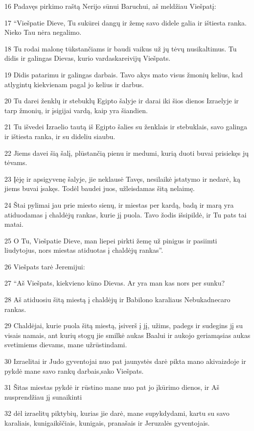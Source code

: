 \par 16 Padavęs pirkimo raštą Nerijo sūnui Baruchui, aš meldžiau Viešpatį: 
\par 17 “Viešpatie Dieve, Tu sukūrei dangų ir žemę savo didele galia ir ištiesta ranka. Nieko Tau nėra negalimo. 
\par 18 Tu rodai malonę tūkstančiams ir baudi vaikus už jų tėvų nusikaltimus. Tu didis ir galingas Dievas, kurio vardas­kareivijų Viešpats. 
\par 19 Didis patarimu ir galingas darbais. Tavo akys mato visus žmonių kelius, kad atlygintų kiekvienam pagal jo kelius ir darbus. 
\par 20 Tu darei ženklų ir stebuklų Egipto šalyje ir darai iki šios dienos Izraelyje ir tarp žmonių, ir įsigijai vardą, kaip yra šiandien. 
\par 21 Tu išvedei Izraelio tautą iš Egipto šalies su ženklais ir stebuklais, savo galinga ir ištiesta ranka, ir su dideliu siaubu. 
\par 22 Jiems davei šią šalį, plūstančią pienu ir medumi, kurią duoti buvai prisiekęs jų tėvams. 
\par 23 Įėję ir apsigyvenę šalyje, jie neklausė Tavęs, nesilaikė įstatymo ir nedarė, ką jiems buvai įsakęs. Todėl baudei juos, užleisdamas šitą nelaimę. 
\par 24 Štai pylimai jau prie miesto sienų, ir miestas per kardą, badą ir marą yra atiduodamas į chaldėjų rankas, kurie jį puola. Tavo žodis išsipildė, ir Tu pats tai matai. 
\par 25 O Tu, Viešpatie Dieve, man liepei pirkti žemę už pinigus ir pasiimti liudytojus, nors miestas atiduotas į chaldėjų rankas”. 
\par 26 Viešpats tarė Jeremijui: 
\par 27 “Aš Viešpats, kiekvieno kūno Dievas. Ar yra man kas nors per sunku? 
\par 28 Aš atiduosiu šitą miestą į chaldėjų ir Babilono karaliaus Nebukadnecaro rankas. 
\par 29 Chaldėjai, kurie puola šitą miestą, įsiverš į jį, užims, padegs ir sudegins jį su visais namais, ant kurių stogų jie smilkė aukas Baalui ir aukojo geriamąsias aukas svetimiems dievams, mane užrūstindami. 
\par 30 Izraelitai ir Judo gyventojai nuo pat jaunystės darė pikta mano akivaizdoje ir pykdė mane savo rankų darbais,­sako Viešpats.­ 
\par 31 Šitas miestas pykdė ir rūstino mane nuo pat jo įkūrimo dienos, ir Aš nusprendžiau jį sunaikinti 
\par 32 dėl izraelitų piktybių, kurias jie darė, mane supykdydami, kartu su savo karaliais, kunigaikščiais, kunigais, pranašais ir Jeruzalės gyventojais. 
